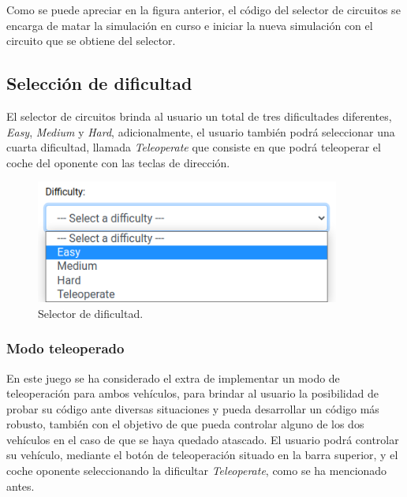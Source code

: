 \documentclass[a4paper, 12pt]{book}
\begin{document}
Como se puede apreciar en la figura anterior, el código del selector de circuitos se encarga de matar la simulación en curso e iniciar la nueva simulación con el circuito que se obtiene del selector.

\subsection{Selección de dificultad}
\label{subsec:follow_line_game_circuito}

El selector de circuitos brinda al usuario un total de tres dificultades diferentes, \emph{Easy}, \emph{Medium} y \emph{Hard}, adicionalmente, el usuario también podrá seleccionar una cuarta dificultad, llamada \emph{Teleoperate} que consiste en que podrá teleoperar el coche del oponente con las teclas de dirección.

\begin{figure}[H]
	\centering
    \includegraphics[width=10cm]{img/difficulty_selector.png}
    \caption{Selector de dificultad.}
    \label{figura:difficulty_selector}
\end{figure}

\subsubsection{Modo teleoperado}
\label{follow_line_game_mode_teleoperado}

En este juego se ha considerado el extra de implementar un modo de teleoperación para ambos vehículos, para brindar al usuario la posibilidad de probar su código ante diversas situaciones y pueda desarrollar un código más robusto, también con el objetivo de que pueda controlar alguno de los dos vehículos en el caso de que se haya quedado atascado. El usuario podrá controlar su vehículo, mediante el botón de teleoperación situado en la barra superior, y el coche oponente seleccionando la dificultar \emph{Teleoperate}, como se ha mencionado antes.
\end{document}
